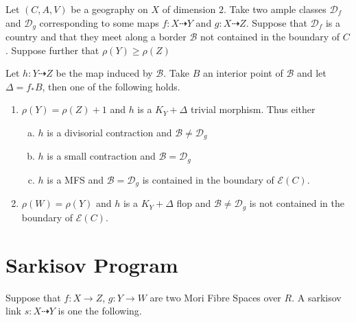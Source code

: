 \documentclass[a4paper,12pt]{amsart}
\begin{document}
	
	\begin{lemma}\cite[Lemma 3.5]{hacon2009sarkisov}\label{links}
		Let $(C,A,V)$ be a geography on $X$ of dimension $2$. Take two ample classes $\mathcal{D}_{f}$ and $\mathcal{D}_{g}$ corresponding to some maps $f:X \dashrightarrow Y$ and $g: X\dashrightarrow Z$. Suppose that $\mathcal{D}_{f}$ is a country and that they meet along a border $\mathcal{B}$ not contained in the boundary of $C$. Suppose further that $\rho(Y) \geq \rho(Z)$
		
		Let $h: Y \dashrightarrow Z$ be the map induced by $\mathcal{B}$. Take $B$ an interior point of $\mathcal{B}$ and let $\Delta=f_{*}B$, then one of the following holds.
			\begin{enumerate}
			\item $\rho(Y)=\rho(Z)+1$ and $h$ is a $K_{Y}+\Delta$ trivial morphism. Thus either
			\begin{enumerate}[a)]
				\item $h$ is a divisorial contraction and $\mathcal{B} \neq \mathcal{D}_{g}$
				\item $h$ is a small contraction and $\mathcal{B}=\mathcal{D}_{g}$
				\item $h$ is a MFS and $\mathcal{B}=\mathcal{D}_{g}$ is contained in the boundary of $\mathcal{E}(C)$.
			\end{enumerate}
			\item $\rho(W)=\rho(Y)$ and $h$ is a $K_{Y}+\Delta$ flop and $\mathcal{B} \neq \mathcal{D}_{g}$ is not contained in the boundary of $\mathcal{E}(C)$.
		\end{enumerate}
	\end{lemma}
	
	

\section{Sarkisov Program} \label{Sarkisov-section}


Suppose that $f:X \to Z$, $g:Y \to W$ are two Mori Fibre Spaces over $R$. A sarkisov link $s:X \dashrightarrow Y$ is one the following.
\end{document}
